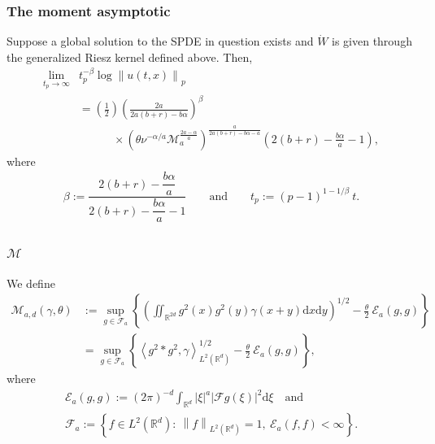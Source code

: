 \documentclass{beamer}
\numberwithin{equation}{section}
\newcommand{\R}{\mathbb{R}}
\newcommand{\Norm}[1]{\left\|  #1   \right\|}
\newcommand{\ud}{\ensuremath{\mathrm{d}}}
\begin{document}
		\begin{frame}[t]
		\frametitle{The moment asymptotic}
		\begin{theorem}
			Suppose a global solution to the SPDE in question exists and $\dot{W}$ is given through the generalized Riesz kernel defined above. Then, 
			\begin{align*}
			\lim_{t_p \to \infty} &  t_p^{-\beta} \log \Norm{u(t,x)}_p 
			\\& =  \left(\frac{1}{2}\right)\left(\frac{2a}{2a(b+r)- b\alpha} \right)^\beta \\
			& \quad \quad \quad  \times \left(\theta\nu^{-\alpha/a} \mathcal{M}_a^{\frac{2a-\alpha}{a}}\right)^{\frac{a}{2a(b+r)-b\alpha-a}}\left(2(b+r)-\frac{b\alpha}{a}-1\right),
			\end{align*}
			where
			\begin{align}
			\label{E:beta-tp}
			\beta := \dfrac{2(b+r)-\dfrac{b\alpha}{a}}{ 2(b+r)-\dfrac{b\alpha}{a} -1 } \qquad \text{and} \qquad
			t_p   := (p-1)^{1-1/\beta} \: t.
			\end{align}
		\end{theorem}
		
	\end{frame}
	
	\begin{frame}[t] 
		\frametitle{$\mathcal{M}$}
		We define
		\begin{align*}
		\mathcal{M}_{a,d}(\gamma,\theta) & := \sup_{g \in \mathcal{F}_a} \left\{ \left( \iint_{\R^{2d}} g^2(x)g^2(y) \gamma(x+y)\ud x\ud y \right)^{1/2} - \frac{\theta}{2}\: \mathcal{E}_a(g,g) \right\} \\
		& = \sup_{g \in \mathcal{F}_a} \left\{ \left\langle g^2 * g^2, \gamma \right\rangle_{L^2(\R^d)}^{1/2} - \frac{\theta}{2}\: \mathcal{E}_a(g,g) \right\},
		\end{align*}
		where
		\begin{gather}
		\mathcal{E}_a(g,g) := (2\pi)^{-d} \int_{\R^d} |\xi|^a |\mathcal{F}g(\xi)|^2 \ud \xi \quad \text{and} \\
		\mathcal{F}_a      := \left\{f\in L^2(\R^d): \: \Norm{f}_{L^2(\R^d)}=1,\: \mathcal{E}_a(f,f)<\infty \right\}.
		\end{gather}
	\end{frame}
	
\end{document}
